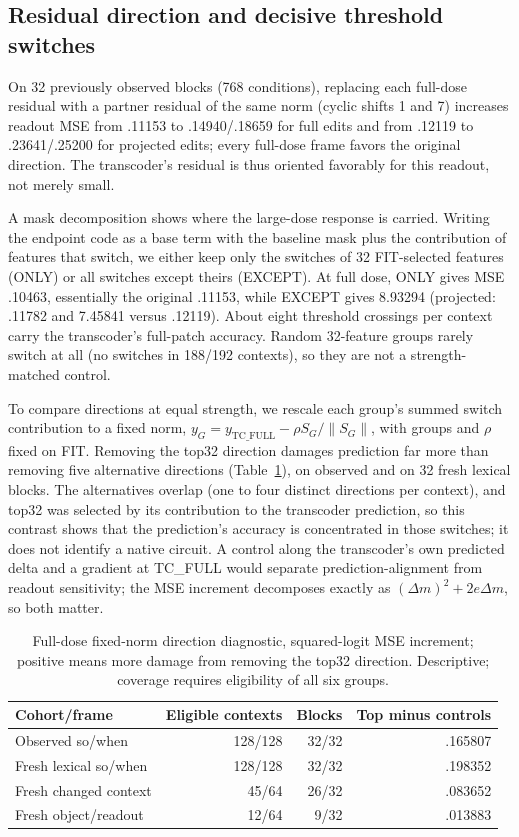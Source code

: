 \documentclass[11pt]{article}
\begin{document}
\subsection{Residual direction and decisive threshold switches}
On 32 previously observed blocks (768 conditions), replacing each full-dose residual with a partner residual of the same norm (cyclic shifts 1 and 7) increases readout MSE from .11153 to .14940/.18659 for full edits and from .12119 to .23641/.25200 for projected edits; every full-dose frame favors the original direction. The transcoder's residual is thus oriented favorably for this readout, not merely small.

A mask decomposition shows where the large-dose response is carried. Writing the endpoint code as a base term with the baseline mask plus the contribution of features that switch, we either keep only the switches of 32 FIT-selected features (ONLY) or all switches except theirs (EXCEPT). At full dose, ONLY gives MSE .10463, essentially the original .11153, while EXCEPT gives 8.93294 (projected: .11782 and 7.45841 versus .12119). About eight threshold crossings per context carry the transcoder's full-patch accuracy. Random 32-feature groups rarely switch at all (no switches in 188/192 contexts), so they are not a strength-matched control.

To compare directions at equal strength, we rescale each group's summed switch contribution to a fixed norm, $y_G=y_{\mathrm{TC\_FULL}}-\rho S_G/\|S_G\|$, with groups and $\rho$ fixed on FIT. Removing the top32 direction damages prediction far more than removing five alternative directions (Table~\ref{tab:norm}), on observed and on 32 fresh lexical blocks. The alternatives overlap (one to four distinct directions per context), and top32 was selected by its contribution to the transcoder prediction, so this contrast shows that the prediction's accuracy is concentrated in those switches; it does not identify a native circuit. A control along the transcoder's own predicted delta and a gradient at TC\_FULL would separate prediction-alignment from readout sensitivity; the MSE increment decomposes exactly as $(\Delta m)^2+2e\Delta m$, so both matter.

\begin{table}[ht]\centering\small
\begin{tabular}{lrrr}\toprule Cohort/frame & Eligible contexts & Blocks & Top minus controls\\\midrule
Observed so/when & 128/128 & 32/32 & .165807\\
Fresh lexical so/when & 128/128 & 32/32 & .198352\\
Fresh changed context & 45/64 & 26/32 & .083652\\
Fresh object/readout & 12/64 & 9/32 & .013883\\\bottomrule\end{tabular}
\caption{Full-dose fixed-norm direction diagnostic, squared-logit MSE increment; positive means more damage from removing the top32 direction. Descriptive; coverage requires eligibility of all six groups.}\label{tab:norm}
\end{table}
\end{document}
